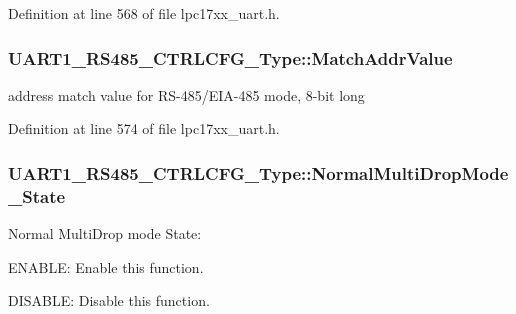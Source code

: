 Definition at line 568 of file lpc17xx\+\_\+uart.\+h.

\subsubsection[{\texorpdfstring{Match\+Addr\+Value}{MatchAddrValue}}]{ U\+A\+R\+T1\+\_\+\+R\+S485\+\_\+\+C\+T\+R\+L\+C\+F\+G\+\_\+\+Type\+::\+Match\+Addr\+Value}\hypertarget{struct_u_a_r_t1___r_s485___c_t_r_l_c_f_g___type_a56883cdc3cee7c7dab7859f55ae9848e}{}\label{struct_u_a_r_t1___r_s485___c_t_r_l_c_f_g___type_a56883cdc3cee7c7dab7859f55ae9848e}
address match value for R\+S-\/485/\+E\+I\+A-\/485 mode, 8-\/bit long 

Definition at line 574 of file lpc17xx\+\_\+uart.\+h.

\subsubsection[{\texorpdfstring{Normal\+Multi\+Drop\+Mode\+\_\+\+State}{NormalMultiDropMode_State}}]{ U\+A\+R\+T1\+\_\+\+R\+S485\+\_\+\+C\+T\+R\+L\+C\+F\+G\+\_\+\+Type\+::\+Normal\+Multi\+Drop\+Mode\+\_\+\+State}\hypertarget{struct_u_a_r_t1___r_s485___c_t_r_l_c_f_g___type_aa2f683b91877a1f1e583484352d9eadc}{}\label{struct_u_a_r_t1___r_s485___c_t_r_l_c_f_g___type_aa2f683b91877a1f1e583484352d9eadc}
Normal Multi\+Drop mode State\+:
\begin{DoxyItemize}
\item E\+N\+A\+B\+LE\+: Enable this function.
\item D\+I\+S\+A\+B\+LE\+: Disable this function. 
\end{DoxyItemize}

